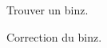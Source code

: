\begin{enigme}[...]
    \begin{changemargin}{-10mm}{-10mm}
        Trouver un binz.
    \end{changemargin}
\end{enigme}


\begin{corrige}
    Correction du binz.
\end{corrige}
 